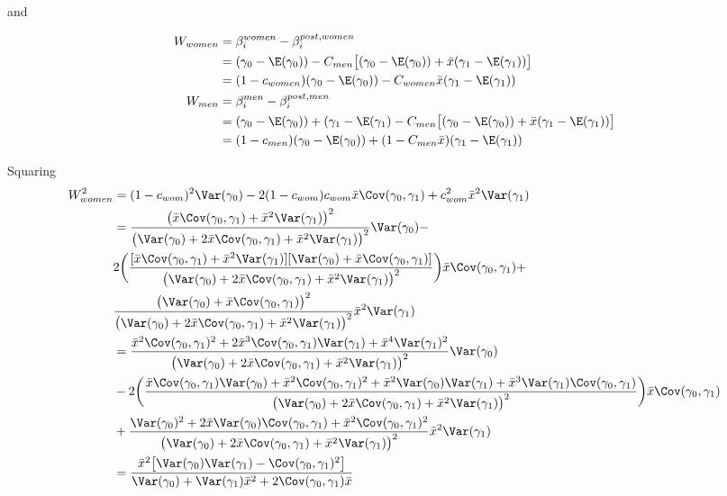 and

\begin{align*}
	W_{women} &=  \beta_i^{women} - \beta_i^{post,women} \\
			&= (\gamma_0 - \E(\gamma_0)) - C_{men} \big[(\gamma_0 - \E(\gamma_0)) + \bar{x} ( \gamma_1 - \E(\gamma_1)) \big] \\
			&= ( 1 - c_{women}) (\gamma_0 - \E(\gamma_0)) - C_{women} \bar{x} (\gamma_1 - \E(\gamma_1)) \\
	W_{men} &=  \beta_i^{men} - \beta_i^{post,men} \\
			&= (\gamma_0 - \E(\gamma_0)) + (\gamma_1 - \E(\gamma_1) - C_{men} \big[(\gamma_0 - \E(\gamma_0)) + \bar{x} ( \gamma_1 - \E(\gamma_1)) \big] \\
			&= ( 1 - c_{men}) (\gamma_0 - \E(\gamma_0)) + (1 - C_{men} \bar{x}) (\gamma_1 - \E(\gamma_1))
\end{align*} 

Squaring
\begin{align*}
	W_{women}^2 &= (1 - c_{wom})^2 \Var(\gamma_0) - 2( 1 - c_{wom})c_{wom} \bar{x}\Cov(\gamma_0, \gamma_1) + c_{wom}^2 \bar{x}^2 \Var(\gamma_1) \\
				&=\frac{\big(\bar{x} \Cov(\gamma_0, \gamma_1) + \bar{x}^2 \Var(\gamma_1)\big)^2}{\big( \Var(\gamma_0) + 2 \bar{x} \Cov(\gamma_0, \gamma_1) + \bar{x}^2\Var(\gamma_1)\big)^2} \Var(\gamma_0) -  \\
				&2 \bigg(\frac{[ \bar{x} \Cov(\gamma_0, \gamma_1) + \bar{x}^2 \Var(\gamma_1) ][ \Var(\gamma_0) + \bar{x} \Cov(\gamma_0, \gamma_1) ]}{\big( \Var(\gamma_0) + 2 \bar{x} \Cov(\gamma_0, \gamma_1) + \bar{x}^2\Var(\gamma_1)\big)^2} \bigg) \bar{x}\Cov(\gamma_0, \gamma_1) + \\
				&\frac{\big(\Var(\gamma_0) + \bar{x} \Cov(\gamma_0, \gamma_1) \big)^2}{\big( \Var(\gamma_0) + 2 \bar{x} \Cov(\gamma_0, \gamma_1) + \bar{x}^2\Var(\gamma_1)\big)^2} \bar{x}^2 \Var(\gamma_1) \\ 
				&=\frac{\bar{x}^2 \Cov(\gamma_0, \gamma_1)^2 + 2\bar{x}^3 \Cov(\gamma_0, \gamma_1) \Var(\gamma_1) + \bar{x}^4 \Var(\gamma_1)^2 }{\big( \Var(\gamma_0) + 2 \bar{x} \Cov(\gamma_0, \gamma_1) + \bar{x}^2\Var(\gamma_1)\big)^2} \Var(\gamma_0)  \\
				&- 2 \bigg(\frac{\bar{x} \Cov(\gamma_0, \gamma_1)\Var(\gamma_0) + \bar{x}^2 \Cov(\gamma_0, \gamma_1)^2 + \bar{x}^2 \Var(\gamma_0) \Var(\gamma_1)  + \bar{x}^3 \Var(\gamma_1)\Cov(\gamma_0, \gamma_1)}{\big( \Var(\gamma_0) + 2 \bar{x} \Cov(\gamma_0, \gamma_1) + \bar{x}^2\Var(\gamma_1)\big)^2} \bigg) \bar{x}\Cov(\gamma_0, \gamma_1) \\
				&+ \frac{\Var(\gamma_0)^2 + 2 \bar{x} \Var(\gamma_0) \Cov(\gamma_0, \gamma_1) + \bar{x}^2 \Cov(\gamma_0, \gamma_1)^2 }{\big( \Var(\gamma_0) + 2 \bar{x} \Cov(\gamma_0, \gamma_1) + \bar{x}^2\Var(\gamma_1)\big)^2} \bar{x}^2 \Var(\gamma_1) \\ 
				  &= \frac{\bar{x}^2 \big[ \Var(\gamma_0) \Var(\gamma_1) - \Cov(\gamma_0, \gamma_1)^2 \big]}{\Var(\gamma_0) + \Var(\gamma_1) \bar{x}^2 + 2 \Cov(\gamma_0, \gamma_1) \bar{x}}
\end{align*} 

